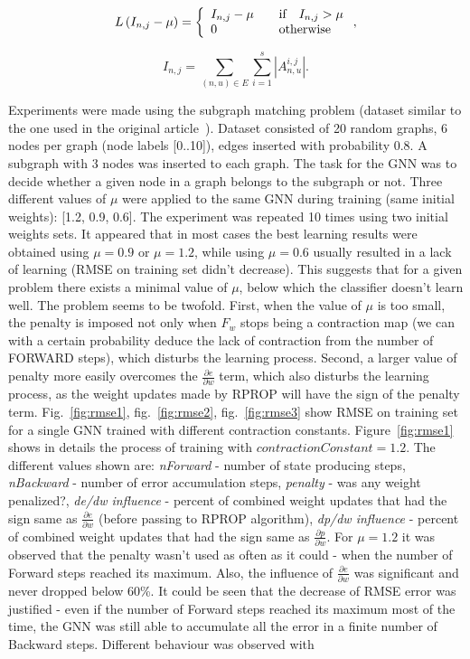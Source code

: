 \documentclass[a4paper, 11pt, twocolumn]{spie}  %
\begin{document}
\begin{equation}
L\left(I_{n,j} - \mu\right) = \left\{
	\begin{array}{l l}
		I_{n,j} - \mu & \quad \text{if} \quad I_{n,j} > \mu \\
		0 & \quad \text{otherwise}
	\end{array} \right. ,
\label{eq:contraction}
\end{equation}

\begin{equation}
I_{n,j} = \sum_{(n, u) \in E} \sum_{i=1}^{s}|A_{n,u}^{i,j}|.
\end{equation}

Experiments were made using the subgraph matching problem (dataset similar to the one used in the original article~\cite{scarselli2009graph}). Dataset consisted of 20 random graphs, 6 nodes per graph (node labels [0..10]), edges inserted with probability 0.8. A subgraph with 3 nodes was inserted to each graph. The task for the GNN was to decide whether a given node in a graph belongs to the subgraph or not. Three different values of $\mu$ were applied to the same GNN during training (same initial weights): [1.2, 0.9, 0.6]. The experiment was repeated 10 times using two initial weights sets. It appeared that in most cases the best learning results were obtained using $\mu = 0.9$ or $\mu = 1.2$, while using $\mu = 0.6$ usually resulted in a lack of learning (RMSE on training set didn't decrease). This suggests that for a given problem there exists a minimal value of $\mu$, below which the classifier doesn't learn well. The problem seems to be twofold. First, when the value of $\mu$ is too small, the penalty is imposed not only when $F_w$ stops being a contraction map (we can with a certain probability deduce the lack of contraction from the number of FORWARD steps), which disturbs the learning process. Second, a larger value of penalty more easily overcomes the $\frac{\partial e}{\partial w}$ term, which also disturbs the learning process, as the weight updates made by RPROP will have the sign of the penalty term. Fig.~\ref{fig:rmse1}, fig.~\ref{fig:rmse2}, fig.~\ref{fig:rmse3} show RMSE on training set for a single GNN trained with different contraction constants. Figure~\ref{fig:rmse1} shows in details the process of training with $contractionConstant = 1.2$. The different values shown are: \emph{nForward} - number of state producing steps, \emph{nBackward} - number of error accumulation steps, \emph{penalty} - was any weight penalized?, \emph{de/dw influence} - percent of combined weight updates that had the sign same as $\frac{\partial e}{\partial w}$ (before passing to RPROP algorithm), \emph{dp/dw influence} - percent of combined weight updates that had the sign same as $\frac{\partial p}{\partial w}$. For $\mu = 1.2$ it was observed that the penalty wasn't used as often as it could - when the number of Forward steps reached its maximum. Also, the influence of $\frac{\partial e}{\partial w}$ was significant and never dropped below 60\%. It could be seen that the decrease of RMSE error was justified - even if the number of Forward steps reached its maximum most of the time, the GNN was still able to accumulate all the error in a finite number of Backward steps. Different behaviour was observed with 
\end{document}
